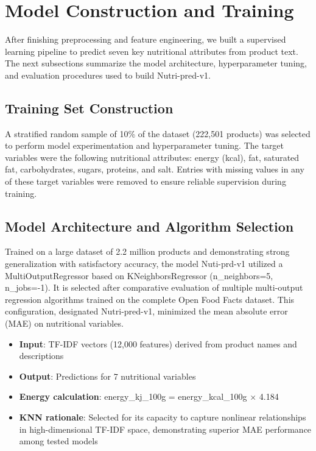 \section{Model Construction and Training}
After finishing preprocessing and feature engineering, we built a supervised learning pipeline to predict seven key nutritional attributes from product text. The next subsections summarize the model architecture, hyperparameter tuning, and evaluation procedures used to build Nutri-pred-v1.

\subsection{Training Set Construction}
A stratified random sample of 10\% of the dataset (222,501 products) was selected to perform model experimentation and hyperparameter tuning. The target variables were the following nutritional attributes: energy (kcal), fat, saturated fat, carbohydrates, sugars, proteins, and salt.
Entries with missing values in any of these target variables were removed to ensure reliable supervision during training.

\subsection{Model Architecture and Algorithm Selection}
Trained on a large dataset of 2.2 million products and demonstrating strong generalization with satisfactory accuracy, the model Nuti-prd-v1 utilized a MultiOutputRegressor based on KNeighborsRegressor (n\_neighbors=5, n\_jobs=-1). It is selected after comparative evaluation of multiple multi-output regression algorithms trained on the complete Open Food Facts dataset. This configuration, designated Nutri-pred-v1, minimized the mean absolute error (MAE) on nutritional variables.

\begin{itemize}[label=-]
    \item \textbf{Input}: TF-IDF vectors (12,000 features) derived from product names and descriptions
    \item \textbf{Output}: Predictions for 7 nutritional variables
    \item \textbf{Energy calculation}: energy\_kj\_100g = energy\_kcal\_100g × 4.184
    \item \textbf{KNN rationale}: Selected for its capacity to capture nonlinear relationships in high-dimensional TF-IDF space, demonstrating superior MAE performance among tested models
\end{itemize}

